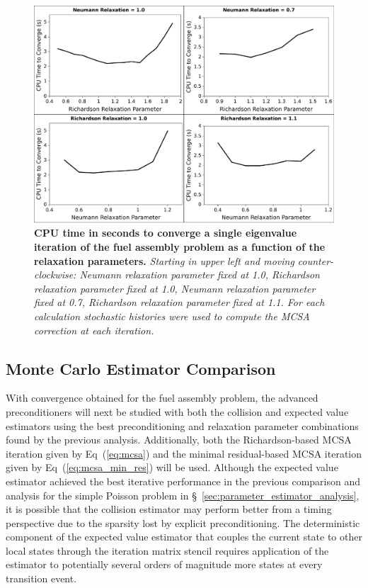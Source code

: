 \begin{figure}[t!]
  \begin{center}
    \includegraphics[width=6in]{chapters/spn_equations/relax_time.pdf}
  \end{center}
  \caption{\textbf{CPU time in seconds to converge a single eigenvalue
      iteration of the fuel assembly problem as a function of the
      relaxation parameters.} \textit{Starting in upper left and
      moving counter-clockwise: Neumann relaxation parameter fixed at
      1.0, Richardson relaxation parameter fixed at 1.0, Neumann
      relaxation parameter fixed at 0.7, Richardson relaxation
      parameter fixed at 1.1. For each calculation 
      stochastic histories were used to compute the MCSA correction at
      each iteration.}}
  \label{fig:relax_time}
\end{figure}

\clearpage

\subsection{Monte Carlo Estimator Comparison}
\label{subsec:spn_estimator_comparison}
With convergence obtained for the fuel assembly problem, the advanced
preconditioners will next be studied with both the collision and
expected value estimators using the best preconditioning and
relaxation parameter combinations found by the previous
analysis. Additionally, both the Richardson-based MCSA iteration given
by Eq~(\ref{eq:mcsa}) and the minimal residual-based MCSA iteration given by
Eq~(\ref{eq:mcsa_min_res}) will be used. Although the expected value
estimator achieved the best iterative performance in the previous
comparison and analysis for the simple Poisson problem in
\S~\ref{sec:parameter_estimator_analysis}, it is possible that the
collision estimator may perform better from a timing perspective due
to the sparsity lost by explicit preconditioning. The deterministic
component of the expected value estimator that couples the current
state to other local states through the iteration matrix stencil
requires application of the estimator to potentially several orders of
magnitude more states at every transition event.

